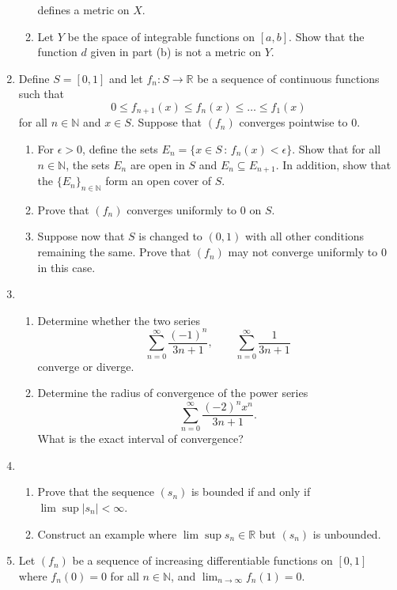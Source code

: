\documentclass[12pt]{article}
\newcommand{\N}{\mathbb{N}}
\newcommand{\R}{\mathbb{R}}
\newcommand{\sep}{\,:\,}
\begin{document}
\begin{enumerate}
\begin{enumerate}
\[        \]
        defines a metric on $X$.
      \item Let $Y$ be the space of integrable functions on $[a,b]$. Show that
        the function $d$ given in part (b) is not a metric on $Y$.
    \end{enumerate}
  \item Define $S=[0,1]$ and let $f_n: S \to \R$ be a sequence of continuous
    functions such that
    \[
      0\le f_{n+1}(x) \le f_n(x) \le \ldots \le f_1(x)
    \]
    for all $n\in \N$ and $x\in S$. Suppose that $(f_n)$ converges pointwise to
    0.
    \begin{enumerate}
      \item For $\epsilon>0$, define the sets $E_n=\{ x\in S \sep f_n(x)
        <\epsilon\}$. Show that for all $n\in \N$, the sets $E_n$ are open in
        $S$ and $E_n \subseteq E_{n+1}$. In addition, show that the
        $\{E_n\}_{n\in \N}$ form an open cover of $S$.
      \item Prove that $(f_n)$ converges uniformly to 0 on $S$.
      \item Suppose now that $S$ is changed to $(0,1)$ with all other
        conditions remaining the same. Prove that $(f_n)$ may not converge
        uniformly to 0 in this case.
    \end{enumerate}
  \item
    \begin{enumerate}
      \item Determine whether the two series
        \[
        \sum_{n=0}^\infty \frac{(-1)^n}{3n+1}, \qquad \sum_{n=0}^\infty \frac{1}{3n+1}
        \]
        converge or diverge.
      \item Determine the radius of convergence of the power series
        \[
          \sum_{n=0}^\infty \frac{(-2)^nx^n}{3n+1}.
        \]
        What is the exact interval of convergence?
    \end{enumerate}
  \item 
    \begin{enumerate}
      \item Prove that the sequence $(s_n)$ is bounded if and only if $\lim \sup |s_n|<\infty$.
      \item Construct an example where $\lim \sup s_n \in \R$ but $(s_n)$ is unbounded.
    \end{enumerate}
  \item
    Let $(f_n)$ be a sequence of increasing differentiable functions on $[0,1]$
    where $f_n(0)=0$ for all $n\in \N$, and $\lim_{n\to \infty} f_n(1) = 0$.

\end{enumerate}
\end{document}

